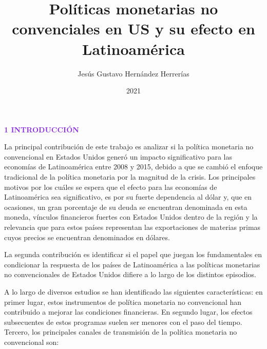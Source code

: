 \documentclass[
  9.5pt,
]{article}
\title{Políticas monetarias no convenciales en US y su efecto en Latinoamérica}
\author{Jesús Gustavo Hernández Herrerías}
\date{2021}
\begin{document}
\maketitle


\textbf{\textcolor{BlueViolet}{1    INTRODUCCIÓN}}

La principal contribución de este trabajo es analizar si la política
monetaria no convencional en Estados Unidos generó un impacto
significativo para las economías de Latinoamérica entre 2008 y 2015,
debido a que se cambió el enfoque tradicional de la política monetaria
por la magnitud de la crisis. Los principales motivos por los cuáles se
espera que el efecto para las economías de Latinoamérica sea
significativo, es por su fuerte dependencia al dólar y, que en
ocasiones, un gran porcentaje de su deuda se encuentran denominada en
esta moneda, vínculos financieros fuertes con Estados Unidos dentro de
la región y la relevancia que para estos países representan las
exportaciones de materias primas cuyos precios se encuentran denominados
en dólares.

La segunda contribución es identificar si el papel que juegan los
fundamentales en condicionar la respuesta de los países de Latinoamérica
a las políticas monetarias no convencionales de Estados Unidos difiere a
lo largo de los distintos episodios.

A lo largo de diversos estudios se han identificado las siguientes
características: en primer lugar, estos instrumentos de política
monetaria no convencional han contribuido a mejorar las condiciones
financieras. En segundo lugar, los efectos subsecuentes de estos
programas suelen ser menores con el paso del tiempo. Tercero, los
principales canales de transmisión de la política monetaria no
convencional son:
\end{document}
